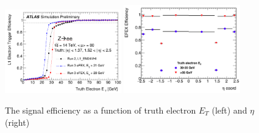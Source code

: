 \begin{figure}[!h]                
	\includegraphics[width=0.45\textwidth]{Chapter6/ele_turnon.png}
	\includegraphics[width=0.45\textwidth]{Chapter6/ele_eta.png}
	\begin{center}
		\caption{The signal efficiency as a function of truth electron $E_{T}$ (left) and $\eta$ (right)}
		\label{Fig:ele_perf}            
	\end{center}
\end{figure}
